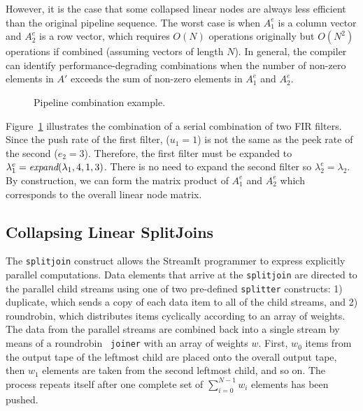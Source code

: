 However, it is the case that some collapsed linear nodes are always
less efficient than the original pipeline sequence.  The worst case is
when $A_1^e$ is a column vector and $A_2^e$ is a row vector, which
requires $O(N)$ operations originally but $O(N^2)$ operations if
combined (assuming vectors of length $N$).  In general, the
compiler can identify performance-degrading combinations when the
number of non-zero elements in $A'$ exceeds the sum of non-zero
elements in $A_1^e$ and $A_2^e$.

\begin{figure}[t]
\center
\epsfxsize=3.2in
\vspace{-6pt}
\caption{Pipeline combination example.}
\label{fig:example-pipeline-combination}
\vspace{-12pt}
\end{figure}

Figure~\ref{fig:example-pipeline-combination} illustrates the 
combination of a serial combination of two FIR filters. Since
the push rate of the first filter, ($u_1=1$) is not the same as
the peek rate of the second ($e_2=3$). Therefore, the first filter
must be expanded to $\lambda_1^e = \mbox{\it expand}(\lambda_1,4,1,3)$.
There is no need to expand the second filter so 
$\lambda_2^e = \lambda_2$. By construction, we can form the
matrix product of $A_1^e$ and $A_2^e$ which corresponds to the
overall linear node matrix.

\subsection{Collapsing Linear SplitJoins}

The {\tt splitjoin} construct allows the StreamIt programmer to
express explicitly parallel computations.  Data elements that arrive
at the {\tt splitjoin} are directed to the parallel child streams
using one of two pre-defined {\tt splitter} constructs: 1) duplicate,
which sends a copy of each data item to all of the child streams, and
2) roundrobin, which distributes items cyclically according to an
array of weights.  The data from the parallel streams are
combined back into a single stream by means of a roundrobin {\tt
joiner} with an array of weights $w$.  First, $w_0$ items from the
output tape of the leftmost child are placed onto the overall output
tape, then $w_1$ elements are taken from the second leftmost child,
and so on.  The process repeats itself after one complete set of
$\sum_{i=0}^{N-1} w_i$ elements has been pushed.

